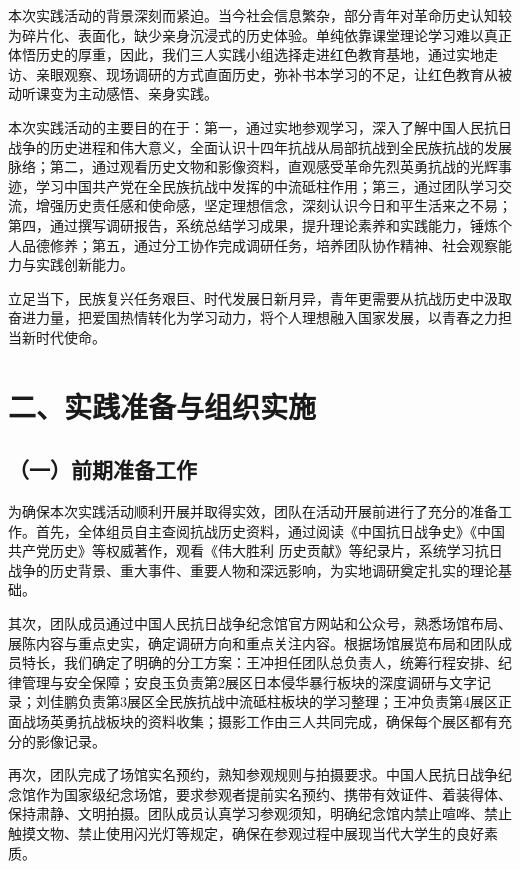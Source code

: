 \documentclass[a4paper,12pt]{article}
\begin{document}
本次实践活动的背景深刻而紧迫。当今社会信息繁杂，部分青年对革命历史认知较为碎片化、表面化，缺少亲身沉浸式的历史体验。单纯依靠课堂理论学习难以真正体悟历史的厚重，因此，我们三人实践小组选择走进红色教育基地，通过实地走访、亲眼观察、现场调研的方式直面历史，弥补书本学习的不足，让红色教育从被动听课变为主动感悟、亲身实践。

本次实践活动的主要目的在于：第一，通过实地参观学习，深入了解中国人民抗日战争的历史进程和伟大意义，全面认识十四年抗战从局部抗战到全民族抗战的发展脉络；第二，通过观看历史文物和影像资料，直观感受革命先烈英勇抗战的光辉事迹，学习中国共产党在全民族抗战中发挥的中流砥柱作用；第三，通过团队学习交流，增强历史责任感和使命感，坚定理想信念，深刻认识今日和平生活来之不易；第四，通过撰写调研报告，系统总结学习成果，提升理论素养和实践能力，锤炼个人品德修养；第五，通过分工协作完成调研任务，培养团队协作精神、社会观察能力与实践创新能力。

立足当下，民族复兴任务艰巨、时代发展日新月异，青年更需要从抗战历史中汲取奋进力量，把爱国热情转化为学习动力，将个人理想融入国家发展，以青春之力担当新时代使命。

\section*{\songti{}\textbf{二、实践准备与组织实施}}

\subsection*{\songti{}\textbf{（一）前期准备工作}}

为确保本次实践活动顺利开展并取得实效，团队在活动开展前进行了充分的准备工作。首先，全体组员自主查阅抗战历史资料，通过阅读《中国抗日战争史》《中国共产党历史》等权威著作，观看《伟大胜利 历史贡献》等纪录片，系统学习抗日战争的历史背景、重大事件、重要人物和深远影响，为实地调研奠定扎实的理论基础。

其次，团队成员通过中国人民抗日战争纪念馆官方网站和公众号，熟悉场馆布局、展陈内容与重点史实，确定调研方向和重点关注内容。根据场馆展览布局和团队成员特长，我们确定了明确的分工方案：王冲担任团队总负责人，统筹行程安排、纪律管理与安全保障；安良玉负责第2展区日本侵华暴行板块的深度调研与文字记录；刘佳鹏负责第3展区全民族抗战中流砥柱板块的学习整理；王冲负责第4展区正面战场英勇抗战板块的资料收集；摄影工作由三人共同完成，确保每个展区都有充分的影像记录。

再次，团队完成了场馆实名预约，熟知参观规则与拍摄要求。中国人民抗日战争纪念馆作为国家级纪念场馆，要求参观者提前实名预约、携带有效证件、着装得体、保持肃静、文明拍摄。团队成员认真学习参观须知，明确纪念馆内禁止喧哗、禁止触摸文物、禁止使用闪光灯等规定，确保在参观过程中展现当代大学生的良好素质。
\end{document}
